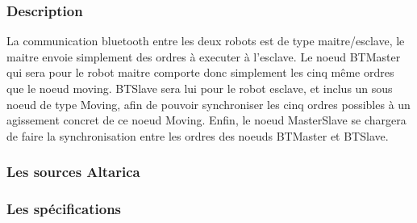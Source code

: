    \subsubsection{Description}
   La communication bluetooth entre les deux robots est de type
   maitre/esclave, le maitre envoie simplement des ordres à executer à
   l'esclave. Le noeud BTMaster qui sera pour le robot maitre comporte
   donc simplement les cinq même ordres que le noeud moving. BTSlave
   sera lui pour le robot esclave, et inclus un sous noeud de type
   Moving, afin de pouvoir synchroniser les cinq ordres possibles à un
   agissement concret de ce noeud Moving. Enfin, le noeud MasterSlave se
   chargera de faire la synchronisation entre les ordres des noeuds
   BTMaster et BTSlave.

   \subsubsection{Les sources Altarica}
   
   
   
   
   \subsubsection{Les spécifications}
   
   
   

   
  
